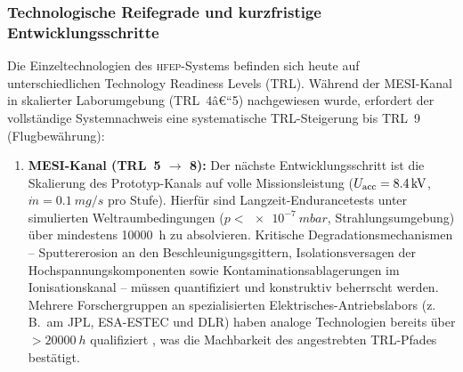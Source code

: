 ﻿\documentclass[a4paper,12pt,twoside]{article}
\theoremstyle{plain}
\theoremstyle{definition}
\theoremstyle{remark}
\newcommand{\mdot}{\dot{m}}
\newcommand{\HFEP}{\textsc{hfep}}
\begin{document}
	\subsubsection{Technologische Reifegrade und kurzfristige Entwicklungsschritte}

	Die Einzeltechnologien des \HFEP-Systems befinden sich heute auf unterschiedlichen
	Technology Readiness Levels (TRL). Während der MESI-Kanal in skalierter
	Laborumgebung (TRL~4â€“5) nachgewiesen wurde, erfordert der vollständige
	Systemnachweis eine systematische TRL-Steigerung bis TRL~9 (Flugbewährung):

	\begin{enumerate}
		\item \textbf{MESI-Kanal (TRL~5 $\to$ 8):}
		Der nächste Entwicklungsschritt ist die Skalierung des Prototyp-Kanals auf
		volle Missionsleistung ($U_{\rm acc} = \SI{8.4}{kV}$, $\mdot = \SI{0.1}{mg/s}$
		pro Stufe). Hierfür sind Langzeit-Endurancetests unter simulierten
		Weltraumbedingungen ($p < \SI{e-7}{mbar}$, Strahlungsumgebung) über mindestens
		\SI{10000}{h} zu absolvieren. Kritische Degradationsmechanismen -- Sputtererosion
		an den Beschleunigungsgittern, Isolation\-sversagen der Hochspannungskomponenten
		sowie Kontaminationsablagerungen im Ionisationskanal -- müssen quantifiziert und
		konstruktiv beherrscht werden. Mehrere Forschergruppen an spezialisierten
		Elektrisches-Antriebslabors (z.\,B.\ am JPL, ESA-ESTEC und DLR) haben analoge
		Technologien bereits über $>\SI{20000}{h}$ qualifiziert \cite{polk1999, goebel2008},
		was die Machbarkeit des angestrebten TRL-Pfades bestätigt.


\end{enumerate}
\end{document}
